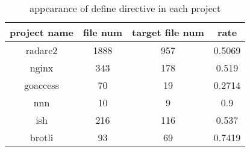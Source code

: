 \begin{table}[h]
	\caption{appearance of define directive in each project}
	\label{table:appearance_of_define_directive_in_each_project}	
		\begin{tabular}{cccc}
		\hline
		project name & file num & target file num & rate \\ 
		\hline \hline
		radare2 & 1888 & 957 & 0.5069 \\ 
		\hline
		nginx & 343 & 178 & 0.519 \\ 
		\hline
		goaccess & 70 & 19 & 0.2714 \\ 
		\hline
		nnn & 10 & 9 & 0.9 \\ 
		\hline
		ish & 216 & 116 & 0.537 \\ 
		\hline
		brotli & 93 & 69 & 0.7419 \\ 
		\hline
	\end{tabular}
\end{table}